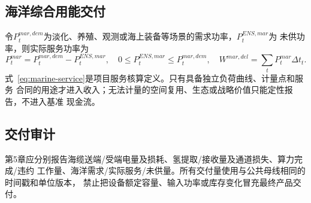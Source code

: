 \subsection{海洋综合用能交付}

令$P_t^{mar,dem}$为淡化、养殖、观测或海上装备等场景的需求功率，$P_t^{ENS,mar}$为
未供功率，则实际服务功率为
\begin{equation}
P_t^{mar}=P_t^{mar,dem}-P_t^{ENS,mar},
\quad
0\le P_t^{ENS,mar}\le P_t^{mar,dem},
\quad
W^{mar,del}=\sum_t P_t^{mar}\Delta t_t.
\label{eq:marine-service}
\end{equation}
式~\eqref{eq:marine-service}是项目服务核算定义。只有具备独立负荷曲线、计量点和服务
合同的用途才进入收入；无法计量的空间复用、生态或战略价值只能定性报告，不进入基准
现金流。

\subsection{交付审计}

第5章应分别报告海缆送端/受端电量及损耗、氢提取/接收量及通道损失、算力完成/违约
工作量、海洋需求/实际服务/未供量。所有交付量使用与公共母线相同的时间戳和单位版本，
禁止把设备额定容量、输入功率或库存变化冒充最终产品交付。
